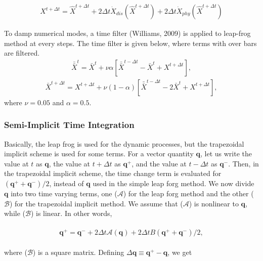 \begin{eqnarray}
{X}^{t+\Delta t}
=  \hat{X}^{t+\Delta t}
+ 2 \Delta t
\dot{X}_{dis}\left( \hat{X}^{t+\Delta t} \right)
+ 2 \Delta t
\dot{X}_{phy}\left( \hat{X}^{t+\Delta t} \right)
\end{eqnarray}

To damp numerical modes, a time filter (Williams, 2009) is applied to leap-frog method at every steps. The time filter is given below, where terms with over bars are filtered. \begin{eqnarray}
\bar{\bar{X}}^{t} = \bar{X}^{t} + \nu \alpha [\bar{\bar{X}}^{t-\Delta t} - \bar{X}^{t} + X^{t+\Delta t}],   \end{eqnarray} \begin{eqnarray}
\bar{X}^{t+\Delta t} = X^{t+\Delta t} + \nu (1-\alpha) [\bar{\bar{X}}^{t-\Delta t} - 2 \bar{X}^{t} + X^{t+\Delta t}],   \end{eqnarray} where \(\nu=0.05\) and \(\alpha=0.5\).

\hypertarget{semi-implicit-time-integration}{%
\subsubsection{Semi-Implicit Time Integration}\label{semi-implicit-time-integration}}

Basically, the leap frog is used for the dynamic processes, but the trapezoidal implicit scheme is used for some terms. For a vector quantity \({\mathbf q}\), let us write the value at \(t\) as
\({\mathbf q}\), the value at \(t+\Delta t\) as \({\mathbf q}^+\), and the value at \(t-\Delta t\) as \({\mathbf q}^-\). Then, in the trapezoidal implicit scheme, the time change term is evaluated for
\(({\mathbf q}^+ + {\mathbf q}^- )/2\), instead of \({\mathbf q}\) used in the simple leap forg method. We now divide \({\mathbf q}\) into two time varying terms, one (\({\mathcal A}\)) for the leap
forg method and the other (\({\mathcal B}\)) for the trapezoidal implicit method. We assume that (\({\mathcal A}\)) is nonlinear to \({\mathbf q}\), while (\({\mathcal B}\)) is linear. In other words,

\begin{eqnarray}
\begin{aligned}
{\mathbf q}^+
= {\mathbf q}^-
+ 2 \Delta t {\mathcal A}( {\mathbf q}  )
+ 2 \Delta t B (   {\mathbf q}^+
+ {\mathbf q}^-   )/2,  \end{aligned}
\end{eqnarray}

where (\({\mathcal B}\)) is a square matrix. Defining \(\Delta {\mathbf q} \equiv {\mathbf q}^+ - {\mathbf q}\), we get

